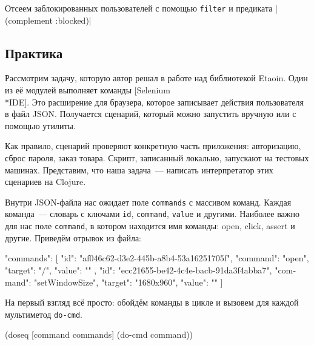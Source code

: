 \fi


Отсеем заблокированных пользователей с помощью \verb|filter| и предиката
\spverb|(complement :blocked)|

\subsection{Практика}


\label{selenium-ide}

Рассмотрим задачу, которую автор решал в работе над библиотекой Etaoin. Один из
её модулей выполняет команды [Selenium\\*IDE].
Это расширение для браузера, которое записывает действия пользователя в файл
JSON. Получается сценарий, который можно запустить вручную или с помощью
утилиты.

Как правило, сценарий проверяют конкретную часть приложения: авторизацию, сброс
пароля, заказ товара. Скрипт, записанный локально, запускают на тестовых
машинах. Представим, что наша задача~--- написать интерпретатор этих сценариев
на Clojure.

Внутри JSON-файла нас ожидает поле \verb|commands| с массивом команд. Каждая
команда~--- словарь с ключами \verb|id|, \verb|command|, \verb|value| и
другими. Наиболее важно для нас поле \verb|command|, в котором находится имя
команды: open, click, assert и другие. Приведём отрывок из файла:

\begin{english}
  \begin{json}
"commands": [{
  "id": "af046c62-d3e2-445b-a8b4-53a16251705f",
  "command": "open",
  "target": "/",
  "value": ""
}, {
  "id": "ecc21655-be42-4c4e-bacb-91da3f4abba7",
  "command": "setWindowSize",
  "target": "1680x960",
  "value": ""
}]
  \end{json}
\end{english}


На первый взгляд всё просто: обойдём команды в цикле и вызовем для каждой
мультиметод \verb|do-cmd|.

\begin{english}
  \begin{clojure}
(doseq [command commands]
  (do-cmd command))
  \end{clojure}
\end{english}

